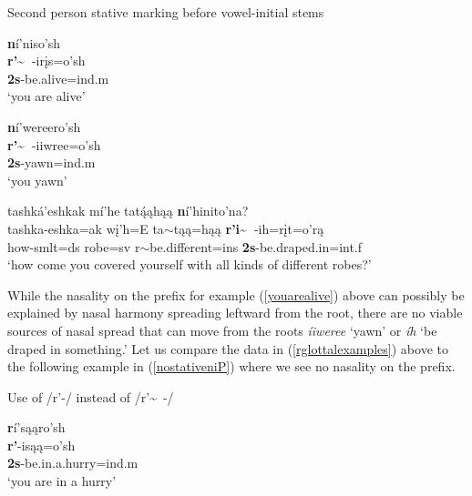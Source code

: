 \begin{exe}
\item\label{rglottalexamples} Second person stative marking before vowel-initial stems

	\begin{xlist}

	\item\label{youarealive} \glll \textbf{n}í'niso'sh\\
	\textbf{r'\~~}-irįs=o'sh\\
	\textbf{2s}-\textnormal{be.alive}=ind.m\\
	\glt `you are alive' \citep[91]{hollow1970}
	
	\item\label{youyawn} \glll \textbf{n}í'wereero'sh\\
	\textbf{r'\~~}-iiwree=o'sh\\
	\textbf{2s}-\textnormal{yawn}=ind.m\\
	\glt `you yawn' \citep[98]{hollow1970}
	
	\item\label{youcoveredyourselves} \glll tashká'eshkak mí'he tatą́ąhąą \textbf{n}í'hinito'na?\\
	tashka-eshka=ak wį'h=E ta$\sim$tąą=hąą \textbf{r'i\~~}-ih=rįt=o'rą\\
	\textnormal{how}-smlt=ds \textnormal{robe}=sv r$\sim$\textnormal{be.different}=ins \textbf{2s}-\textnormal{be.draped.in}=int.f\\
	\glt `how come you covered yourself with all kinds of different robes?' \citep[237]{hollow1973b}
	
	\end{xlist}
	
\end{exe}

While the nasality on the prefix for example (\ref{youarealive}) above can possibly be explained by nasal harmony spreading leftward from the root, there are no viable sources of nasal spread that can move from the roots \textit{íiweree} `yawn' or \textit{íh} `be draped in something.' Let us compare the data in (\ref{rglottalexamples}) above to the following example in (\ref{nostativeniP}) where we see no nasality on the prefix.

\begin{exe}
\item\label{nostativeniP} Use of /r'-/ instead of /r'\~~-/

	\glll \textbf{r}í'sąąro'sh\\
	\textbf{r'}-isąą=o'sh\\
	\textbf{2s}-\textnormal{be.in.a.hurry}=ind.m\\
	\glt `you are in a hurry' \citep[92]{hollow1970}

\end{exe}

